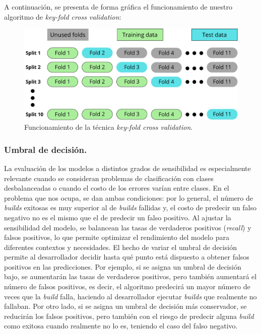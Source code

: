 A continuación, se presenta de forma gráfica el funcionamiento de nuestro algoritmo de
\textit{key-fold cross validation}:

\begin{figure}[H]
    \centering
    \includegraphics[scale=0.5]{images/Cross validation.pdf}
    \caption{Funcionamiento de la técnica \textit{key-fold cross validation}.}
    \label{fig:confusion_matrix}
\end{figure}

\subsubsection{Umbral de decisión.}
La evaluación de los modelos a distintos grados de sensibilidad es especialmente relevante cuando
se consideran problemas de clasificación con clases desbalanceadas o cuando el costo de los
errores varían entre clases. En el problema que nos ocupa, se dan ambas condiciones: por lo
general, el número de \textit{builds} exitosas es muy superior al de \textit{builds} fallidas y,
el costo de predecir un falso negativo no es el mismo que el de predecir un falso positivo. Al
ajustar la sensibilidad del modelo, se balancean las tasas de verdaderos positivos
(\textit{recall}) y falsos positivos, lo que permite optimizar el rendimiento del modelo para
diferentes contextos y necesidades. El hecho de variar el umbral de decisión permite al
desarrollador decidir hasta qué punto está dispuesto a obtener falsos positivos en las
predicciones. Por ejemplo, si se asigna un umbral de decisión bajo, se aumentarán las tasas de
verdaderos positivos, pero también aumentará el número de falsos positivos, es decir, el algoritmo
predecirá un mayor número de veces que la \textit{build} falla, haciendo al desarrollador ejecutar
\textit{builds} que realmente no fallaban. Por otro lado, si se asigna un umbral de decisión más
conservador, se reducirán los falsos positivos, pero también con el riesgo de predecir alguna
\textit{build} como exitosa cuando realmente no lo es, teniendo el caso del falso negativo.\\


